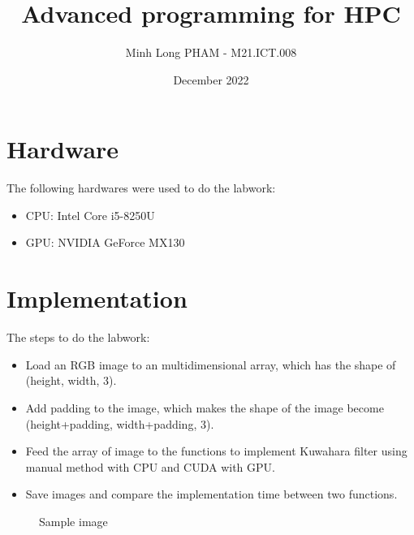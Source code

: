 \documentclass{article}
\title{Advanced programming for HPC}
\author{Minh Long PHAM - M21.ICT.008}
\date{December 2022}
\begin{document}
\maketitle

\section{Hardware}
The following hardwares were used to do the labwork:
\begin{itemize}
    \item CPU: Intel Core i5-8250U 
    \item GPU: NVIDIA GeForce MX130
\end{itemize}

\section{Implementation}
The steps to do the labwork:
\begin{itemize}
    \item Load an RGB image to an multidimensional array, which has the shape of (height, width, 3).
    \item Add padding to the image, which makes the shape of the image become (height+padding, width+padding, 3).
    \item Feed the array of image to the functions to implement Kuwahara filter using manual method with CPU and CUDA with GPU.
    \item Save images and compare the implementation time between two functions.
\end{itemize}

\begin{figure}[H]
    \caption{Sample image}
\end{figure}
\end{document}
